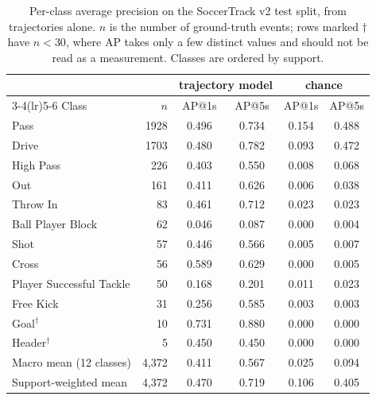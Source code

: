 \begin{table}[t]
  \centering
  \caption{Per-class average precision on the SoccerTrack v2 test split, from trajectories alone. $n$ is the number of ground-truth events; rows marked $\dagger$ have $n < 30$, where AP takes only a few distinct values and should not be read as a measurement. Classes are ordered by support.}
  \label{tab:bas_per_class}
  \small
  \begin{tabular}{lrcccc}
    \toprule
    & & \multicolumn{2}{c}{trajectory model} & \multicolumn{2}{c}{chance} \\
    \cmidrule(lr){3-4}\cmidrule(lr){5-6}
    Class & $n$ & AP@1s & AP@5s & AP@1s & AP@5s \\
    \midrule
    Pass & 1928 & 0.496 & 0.734 & 0.154 & 0.488 \\
    Drive & 1703 & 0.480 & 0.782 & 0.093 & 0.472 \\
    High Pass & 226 & 0.403 & 0.550 & 0.008 & 0.068 \\
    Out & 161 & 0.411 & 0.626 & 0.006 & 0.038 \\
    Throw In & 83 & 0.461 & 0.712 & 0.023 & 0.023 \\
    Ball Player Block & 62 & 0.046 & 0.087 & 0.000 & 0.004 \\
    Shot & 57 & 0.446 & 0.566 & 0.005 & 0.007 \\
    Cross & 56 & 0.589 & 0.629 & 0.000 & 0.005 \\
    Player Successful Tackle & 50 & 0.168 & 0.201 & 0.011 & 0.023 \\
    Free Kick & 31 & 0.256 & 0.585 & 0.003 & 0.003 \\
    Goal$^\dagger$ & 10 & 0.731 & 0.880 & 0.000 & 0.000 \\
    Header$^\dagger$ & 5 & 0.450 & 0.450 & 0.000 & 0.000 \\
    \midrule
    Macro mean (12 classes) & 4,372 & 0.411 & 0.567 & 0.025 & 0.094 \\
    Support-weighted mean & 4,372 & 0.470 & 0.719 & 0.106 & 0.405 \\
    \bottomrule
  \end{tabular}
\end{table}
